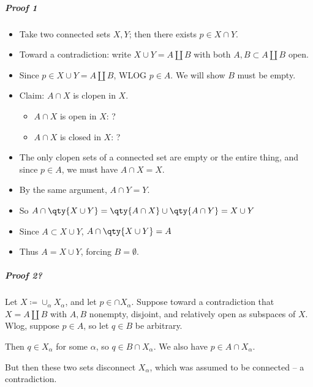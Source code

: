 \begin{solution}

\hfill

\begin{concept}

\hfill

\end{concept}

\hypertarget{proof-1-1}{%
\subparagraph{Proof 1}\label{proof-1-1}}

\begin{itemize}
\tightlist
\item
  Take two connected sets \(X, Y\); then there exists \(p\in X\cap Y\).
\item
  Toward a contradiction: write \(X\cup Y = A {\coprod}B\) with both
  \(A, B \subset A{\coprod}B\) open.
\item
  Since \(p\in X \cup Y = A{\coprod}B\), WLOG \(p\in A\). We will show
  \(B\) must be empty.
\item
  Claim: \(A\cap X\) is clopen in \(X\).

  \begin{itemize}
  \tightlist
  \item
    \(A\cap X\) is open in \(X\): ?
  \item
    \(A\cap X\) is closed in \(X\): ?
  \end{itemize}
\item
  The only clopen sets of a connected set are empty or the entire thing,
  and since \(p\in A\), we must have \(A\cap X = X\).
\item
  By the same argument, \(A\cap Y = Y\).
\item
  So \(A\cap\qty{X\cup Y} = \qty{A\cap X} \cup\qty{A\cap Y} = X\cup Y\)
\item
  Since \(A\subset X\cup Y\), \(A\cap\qty{X\cup Y} = A\)
\item
  Thus \(A = X\cup Y\), forcing \(B = \emptyset\).
\end{itemize}

\hypertarget{proof-2-1}{%
\subparagraph{Proof 2?}\label{proof-2-1}}

Let \(X \coloneqq\cup_\alpha X_\alpha\), and let \(p\in \cap X_\alpha\).
Suppose toward a contradiction that \(X = A {\coprod}B\) with \(A,B\)
nonempty, disjoint, and relatively open as subspaces of \(X\). Wlog,
suppose \(p\in A\), so let \(q\in B\) be arbitrary.

Then \(q\in X_\alpha\) for some \(\alpha\), so \(q\in B \cap X_\alpha\).
We also have \(p\in A \cap X_\alpha\).

But then these two sets disconnect \(X_\alpha\), which was assumed to be
connected -- a contradiction.

\end{solution}

